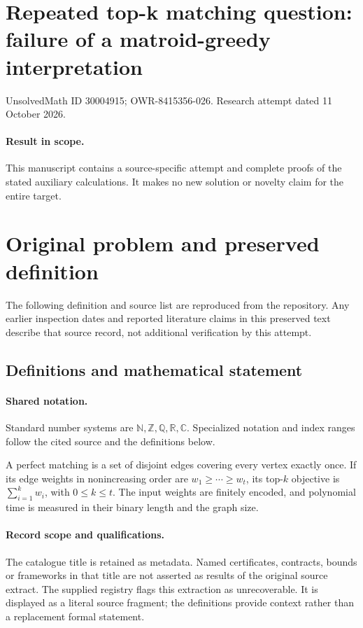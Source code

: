 \documentclass[11pt]{article}
\begin{document}
\section*{Repeated top-k matching question: failure of a matroid-greedy interpretation}
\noindent UnsolvedMath ID 30004915; OWR-8415356-026. Research attempt dated 11 October 2026.
\paragraph{Result in scope.}This manuscript contains a source-specific attempt and complete proofs of the stated auxiliary calculations. It makes no new solution or novelty claim for the entire target.
\section{Original problem and preserved definition}
The following definition and source list are reproduced from the repository. Any earlier inspection dates and reported literature claims in this preserved text describe that source record, not additional verification by this attempt.
\subsection{Definitions and mathematical statement}

\paragraph{Shared notation.}Standard number systems are $\mathbb N,\mathbb Z,\mathbb Q,\mathbb R,\mathbb C$. Specialized notation and index ranges follow the cited source and the definitions below.


A perfect matching is a set of disjoint edges covering every vertex exactly once. If its edge weights in nonincreasing order are $w_1\geq\cdots\geq w_t$, its top-$k$ objective is $\sum_{i=1}^kw_i$, with $0\leq k\leq t$. The input weights are finitely encoded, and polynomial time is measured in their binary length and the graph size.
\paragraph{Record scope and qualifications.}
The catalogue title is retained as metadata. Named certificates, contracts, bounds or frameworks in that title are not asserted as results of the original source extract.
The supplied registry flags this extraction as unrecoverable. It is displayed as a literal source fragment; the definitions provide context rather than a replacement formal statement.
\end{document}
